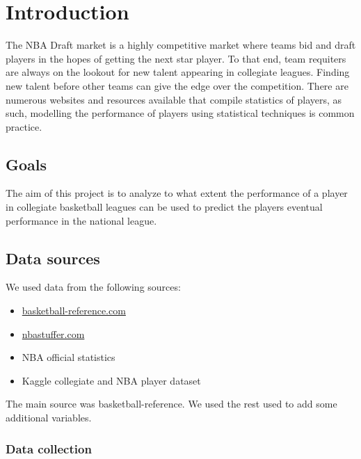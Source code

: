 
\section{Introduction}%
\label{sec:introduction}

The NBA Draft market is a highly competitive market where teams bid and draft
players in the hopes of getting the next star player. To that end, team
requiters are always on the lookout for new talent appearing in collegiate
leagues. Finding new talent before other teams can give the edge over the
competition. There are numerous websites and resources available that compile
statistics of players, as such, modelling the performance of players using
statistical techniques is common practice.

\subsection{Goals}%
\label{sub:goals}

The aim of this project is to analyze to what extent the performance of a player
in collegiate basketball leagues can be used to predict the players eventual
performance in the national league.

\subsection{Data sources}%
\label{sub:data-sources}

We used data from the following sources:

\begin{itemize}
  \item \href{http://www.basketball-reference.com}{basketball-reference.com} \cite{noauthor_basketball_nodate}
  \item \href{http://www.nbastuffer.com}{nbastuffer.com} \cite{noauthor_nbastuffer_2017}
  \item NBA official statistics \cite{noauthor_draft_nodate}
  \item Kaggle collegiate and NBA player dataset \cite{noauthor_college_nodate,noauthor_t-rank_nodate}
\end{itemize}

The main source was basketball-reference. We used the rest used to add some
additional variables.

\subsubsection{Data collection}%
\label{ssub:data-collection}

